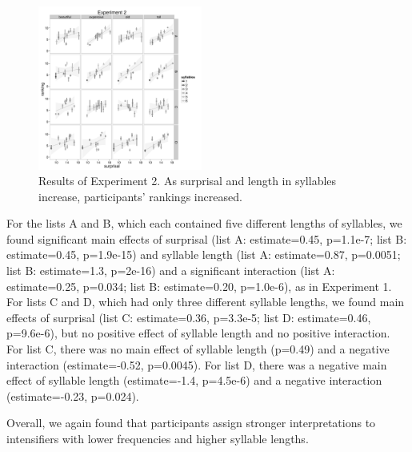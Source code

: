 \documentclass[10pt,letterpaper]{article}
\begin{document}
\begin{figure}[ht]
\begin{center}
\includegraphics[width=0.48\textwidth]{analysis_files_for_writeup/images/exp2-plot.png}
\end{center}
\caption{Results of Experiment 2. As surprisal and length in syllables increase, participants' rankings increased.} 
\label{exp2-plot}
\end{figure}

For the lists A and B, which each contained five different lengths of syllables, we found significant main effects of surprisal (list A: estimate=0.45, p=1.1e-7; list B: estimate=0.45, p=1.9e-15) and syllable length (list A: estimate=0.87, p=0.0051; list B: estimate=1.3, p=2e-16) and a significant interaction (list A: estimate=0.25, p=0.034; list B: estimate=0.20, p=1.0e-6), as in Experiment 1.
For lists C and D, which had only three different syllable lengths, we found main effects of surprisal (list C: estimate=0.36, p=3.3e-5; list D: estimate=0.46, p=9.6e-6), but no positive effect of syllable length and no positive interaction.
For list C, there was no main effect of syllable length (p=0.49) and a negative interaction (estimate=-0.52, p=0.0045). For list D, there was a negative main effect of syllable length (estimate=-1.4, p=4.5e-6) and a negative interaction (estimate=-0.23, p=0.024).

Overall, we again found that participants assign stronger interpretations to intensifiers with lower frequencies and higher syllable lengths.

\end{document}
